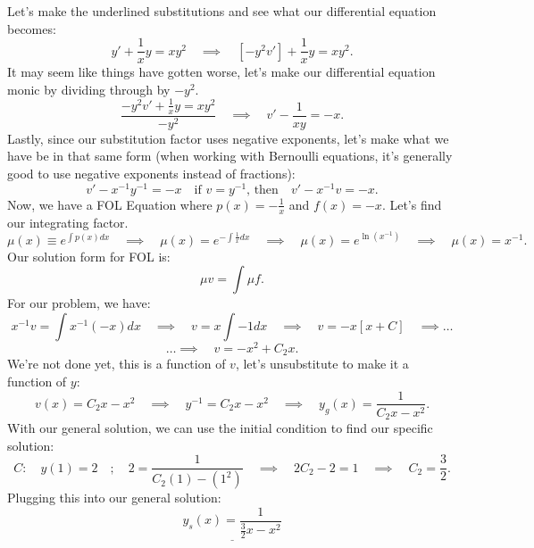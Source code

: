 \documentclass[a4paper,12pt]{article} %
\begin{document}
Let's make the underlined substitutions and see what our differential equation becomes:
$$ y' + \frac{1}{x}y = xy^2 \quad\implies \quad [-y^2v'] + \frac{1}{x}y = xy^2. $$
It may seem like things have gotten worse, let's make our differential equation monic by dividing through by $-y^2$.
$$ \frac{-y^2v' + \frac{1}{x}y = xy^2}{-y^2} \quad\implies \quad v' -\frac{1}{xy} = -x. $$
Lastly, since our substitution factor uses negative exponents, let's make what we have be in that same form (when working with Bernoulli equations, it's generally good to use negative exponents instead of fractions):
$$ v' - x^{-1}y^{-1} = -x \quad\text{if $v=y^{-1}$, then}\quad v' - x^{-1}v = -x. $$
Now, we have a FOL Equation where $p(x) = -\frac{1}{x}$ and $f(x)=-x$. Let's find our integrating factor.
$$ \mu(x) \equiv e^{\int p(x)dx} \quad\implies \quad \mu(x) = e^{-\int \frac{1}{x} dx} \quad\implies \quad \mu(x) = e^{\ln{(x^{-1})}} \quad\implies \quad \mu(x) = x^{-1}. $$
Our solution form for FOL is:
$$ \mu v = \int \mu f.$$
For our problem, we have:
$$ x^{-1}v = \int x^{-1}(-x)dx \quad\implies \quad v = x\int -1dx \quad\implies \quad v = -x[x + C] \quad\implies \ldots $$
$$\ldots\implies \quad v = -x^2 + C_2x. $$
We're not done yet, this is a function of $v$, let's unsubstitute to make it a function of $y$:
$$ v(x) =  C_2x -x^2 \quad\implies \quad y^{-1} = C_2x-x^2 \quad \implies \quad y_g(x) = \frac{1}{C_2x-x^2}.$$
With our general solution, we can use the initial condition to find our specific solution:
$$ C: \quad y(1)=2\quad;\quad 2 = \frac{1}{C_2(1) - (1^2)} \quad\implies \quad 2C_2 -2 = 1 \quad\implies \quad  C_2 = \frac{3}{2}. $$
Plugging this into our general solution:
$$ \underline{\boxed{y_s(x) = \frac{1}{\frac{3}{2}x - x^2}}} $$
\end{document}
